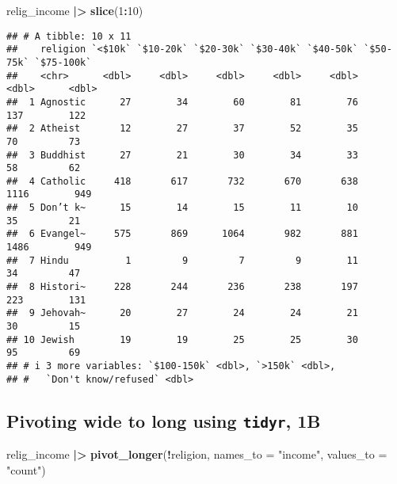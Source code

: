 \documentclass[
  11pt,
]{article}
\newenvironment{Shaded}{\begin{snugshade}}{\end{snugshade}}
\newcommand{\AttributeTok}[1]{\textcolor[rgb]{0.13,0.29,0.53}{#1}}
\newcommand{\DecValTok}[1]{\textcolor[rgb]{0.00,0.00,0.81}{#1}}
\newcommand{\FunctionTok}[1]{\textcolor[rgb]{0.13,0.29,0.53}{\textbf{#1}}}
\newcommand{\NormalTok}[1]{#1}
\newcommand{\SpecialCharTok}[1]{\textcolor[rgb]{0.81,0.36,0.00}{\textbf{#1}}}
\newcommand{\StringTok}[1]{\textcolor[rgb]{0.31,0.60,0.02}{#1}}
\begin{document}
\footnotesize

\begin{Shaded}
\begin{Highlighting}[]
\NormalTok{relig\_income }\SpecialCharTok{|\textgreater{}} \FunctionTok{slice}\NormalTok{(}\DecValTok{1}\SpecialCharTok{:}\DecValTok{10}\NormalTok{)}
\end{Highlighting}
\end{Shaded}

\begin{verbatim}
## # A tibble: 10 x 11
##    religion `<$10k` `$10-20k` `$20-30k` `$30-40k` `$40-50k` `$50-75k` `$75-100k`
##    <chr>      <dbl>     <dbl>     <dbl>     <dbl>     <dbl>     <dbl>      <dbl>
##  1 Agnostic      27        34        60        81        76       137        122
##  2 Atheist       12        27        37        52        35        70         73
##  3 Buddhist      27        21        30        34        33        58         62
##  4 Catholic     418       617       732       670       638      1116        949
##  5 Don’t k~      15        14        15        11        10        35         21
##  6 Evangel~     575       869      1064       982       881      1486        949
##  7 Hindu          1         9         7         9        11        34         47
##  8 Histori~     228       244       236       238       197       223        131
##  9 Jehovah~      20        27        24        24        21        30         15
## 10 Jewish        19        19        25        25        30        95         69
## # i 3 more variables: `$100-150k` <dbl>, `>150k` <dbl>,
## #   `Don't know/refused` <dbl>
\end{verbatim}

\normalsize

\hypertarget{pivoting-wide-to-long-using-tidyr-1b}{%
\subsection{\texorpdfstring{Pivoting wide to long using \texttt{tidyr},
1B}{Pivoting wide to long using tidyr, 1B}}\label{pivoting-wide-to-long-using-tidyr-1b}}

\footnotesize

\begin{Shaded}
\begin{Highlighting}[]
\NormalTok{relig\_income }\SpecialCharTok{|\textgreater{}} 
  \FunctionTok{pivot\_longer}\NormalTok{(}\SpecialCharTok{!}\NormalTok{religion, }
               \AttributeTok{names\_to =} \StringTok{"income"}\NormalTok{, }
               \AttributeTok{values\_to =} \StringTok{"count"}\NormalTok{)}
\end{Highlighting}
\end{Shaded}
\end{document}
